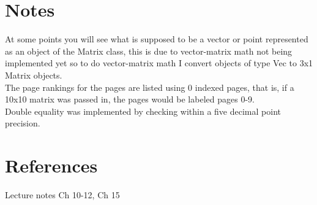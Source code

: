 \documentclass[11pt]{article}
\begin{document}
\section*{Notes}
At some points you will see what is supposed to be a vector or point represented as an object of the Matrix class, this is due to vector-matrix math not being implemented yet so to do vector-matrix math I convert objects of type Vec to 3x1 Matrix objects.\\
The page rankings for the pages are listed using 0 indexed pages,  that is, if a 10x10 matrix was passed in, the pages would be labeled pages 0-9.\\
Double equality was implemented by checking within a five decimal point precision.
\section*{References}
Lecture notes Ch 10-12, Ch 15
\end{document}
